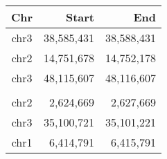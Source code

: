 \begin{tabular}{crr}
  \hline
  Chr & Start & End\\\hline
  chr3 & 38,585,431 & 38,588,431\\
  chr2 & 14,751,678 & 14,752,178\\
  chr3 & 48,115,607 & 48,116,607\\
  \\
  chr2 & 2,624,669 & 2,627,669\\
  chr3 & 35,100,721 & 35,101,221\\
  chr1 & 6,414,791 & 6,415,791\\\hline
\end{tabular}
